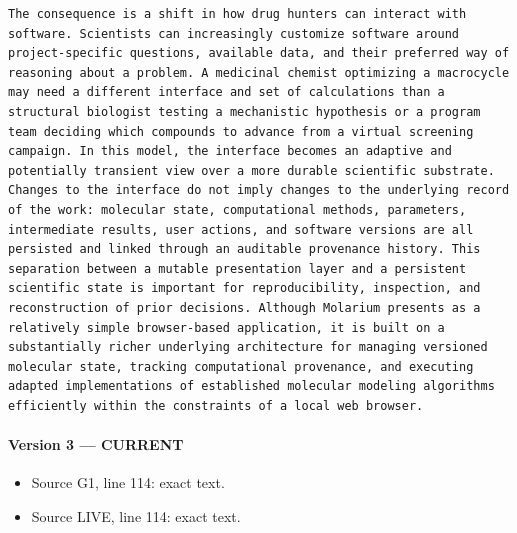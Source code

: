 \documentclass[11pt]{article}
\begin{document}
\begin{lstlisting}
The consequence is a shift in how drug hunters can interact with software. Scientists can increasingly customize software around project-specific questions, available data, and their preferred way of reasoning about a problem. A medicinal chemist optimizing a macrocycle may need a different interface and set of calculations than a structural biologist testing a mechanistic hypothesis or a program team deciding which compounds to advance from a virtual screening campaign. In this model, the interface becomes an adaptive and potentially transient view over a more durable scientific substrate. Changes to the interface do not imply changes to the underlying record of the work: molecular state, computational methods, parameters, intermediate results, user actions, and software versions are all persisted and linked through an auditable provenance history. This separation between a mutable presentation layer and a persistent scientific state is important for reproducibility, inspection, and reconstruction of prior decisions. Although Molarium presents as a relatively simple browser-based application, it is built on a substantially richer underlying architecture for managing versioned molecular state, tracking computational provenance, and executing adapted implementations of established molecular modeling algorithms efficiently within the constraints of a local web browser.
\end{lstlisting}

\paragraph{Version 3 --- CURRENT}

\begin{itemize}[leftmargin=*]
\item Source G1, line 114: exact text.
\item Source LIVE, line 114: exact text.
\end{itemize}
\end{document}
